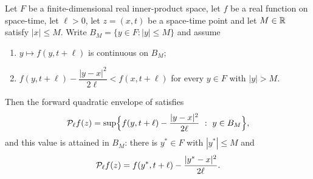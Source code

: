 \begin{lemma}
Let $F$ be a finite-dimensional real inner-product space, let $f$ be a real
function on space-time, let $\ell>0$, let $z=(x,t)$ be a space-time point and let
$M\in\mathbb{R}$ satisfy $|x|\le M$. Write $B_M=\{y\in F:|y|\le M\}$ and assume
\begin{enumerate}
\item[(a)] $y\mapsto f(y,t+\ell)$ is continuous on $B_M$;
\item[(b)] $f(y,t+\ell)-\dfrac{|y-x|^2}{2\ell}<f(x,t+\ell)$ for every $y\in F$
with $|y|>M$.
\end{enumerate}
Then the forward quadratic envelope of  satisfies
\[
  \mathcal{P}_\ell f(z)
  =\sup\Bigl\{f(y,t+\ell)-\frac{|y-x|^2}{2\ell}\ :\ y\in B_M\Bigr\},
\]
and this value is attained in $B_M$: there is $y^\ast\in F$ with $|y^\ast|\le M$
and
\[
  \mathcal{P}_\ell f(z)=f(y^\ast,t+\ell)-\frac{|y^\ast-x|^2}{2\ell}.
\]
\end{lemma}
